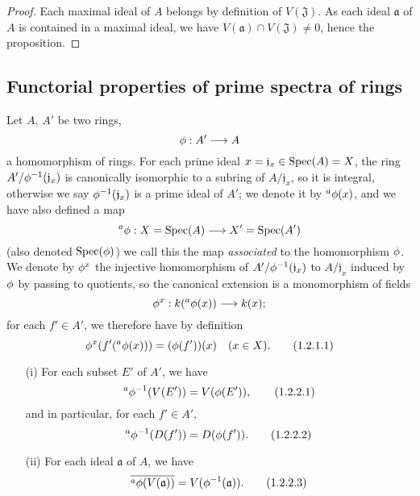\begin{proof}
\label{proof-1.1.1.15}
Each maximal ideal of $A$ belongs by definition of $V(\mathfrak{J})$.
As each ideal $\mathfrak{a}$ of $A$ is contained in a maximal ideal, we have
$V(\mathfrak{a})\cap V(\mathfrak{J})\neq 0$, hence the proposition.
\end{proof}

\subsection{Functorial properties of prime spectra of rings}
\label{subsection-func-prop}

\begin{env}[1.2.1]
\label{1.1.2.1}
Let $A$, $A'$ be two rings,
\[
  \phi:A'\longrightarrow A
\]
a homomorphism of rings. For each prime ideal $x=\mathfrak{j}_x\in{\mathop{\mathrm{Spec}}\nolimits}(A)=X$, the
ring $A'/\phi^{-1}(\mathfrak{j}_x)$ is canonically isomorphic to a subring of
$A/\mathfrak{j}_x$, so it is integral, otherwise we say
$\phi^{-1}(\mathfrak{j}_x)$ is a prime ideal of $A'$; we denote it by
${}^a\phi(x)$, and we have also defined a map
\[
  {}^a\phi:X={\mathop{\mathrm{Spec}}\nolimits}(A)\longrightarrow X'={\mathop{\mathrm{Spec}}\nolimits}(A')
\]
(also denoted ${\mathop{\mathrm{Spec}}\nolimits}(\phi)$) we call this the map {\em associated} to the
homomorphism $\phi$. We denote by $\phi^x$ the injective homomorphism of
$A'/\phi^{-1}(\mathfrak{j}_x)$ to $A/\mathfrak{j}_x$ induced by $\phi$ by
passing to quotients, so the canonical extension is a monomorphism of fields
\[
  \phi^x:k({}^a\phi(x))\longrightarrow k(x);
\]
for each $f'\in A'$, we therefore have by definition
\[
  \phi^x(f'({}^a\phi(x)))=(\phi(f'))(x)\quad(x\in X).
  \tag{1.2.1.1}
\]
\end{env}

\begin{prop}[1.2.2]
\label{1.1.2.2}
\medskip\noindent
\begin{itemize}
  \item[{\rm(i)}] For each subset $E'$ of $A'$, we have
    \[
      {}^a\phi^{-1}(V(E'))=V(\phi(E')),
      \tag{1.2.2.1}
    \]
    and in particular, for each $f'\in A'$,
    \[
      {}^a\phi^{-1}(D(f'))=D(\phi(f')).
      \tag{1.2.2.2}
    \]
  \item[{\rm(ii)}] For each ideal $\mathfrak{a}$ of $A$, we have
    \[
      \overline{{}^a\phi(V(\mathfrak{a}))}=V(\phi^{-1}(\mathfrak{a})).
      \tag{1.2.2.3}
    \]
\end{itemize}
\end{prop}

